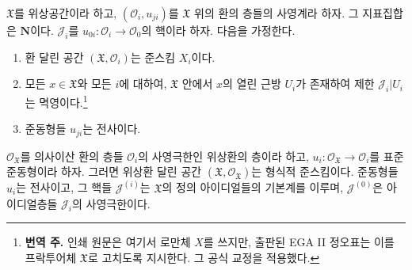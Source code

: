 \begin{proposition}[10.6.3]
\label{I.10.6.3-ko}
$\mathfrak{X}$를 위상공간이라 하고,
$(\mathscr{O}_i,u_{ji})$를 $\mathfrak{X}$ 위의 환의 층들의 사영계라
하자. 그 지표집합은 $\mathbf{N}$이다. $\mathscr{J}_i$를
$u_{0i}:\mathscr{O}_i\to\mathscr{O}_0$의 핵이라 하자. 다음을 가정한다.
\begin{enumerate}
  \item[a)] 환 달린 공간 $(\mathfrak{X},\mathscr{O}_i)$는 준스킴
    $X_i$이다.
  \item[b)] 모든 $x\in\mathfrak{X}$와 모든 $i$에 대하여,
    $\mathfrak{X}$ 안에서 $x$의 열린 근방 $U_i$가 존재하여 제한
    $\mathscr{J}_i|U_i$는 멱영이다.\footnote{\textbf{번역 주.} 인쇄
    원문은 여기서 로만체 $X$를 쓰지만, 출판된 EGA II 정오표는 이를
    프락투어체 $\mathfrak{X}$로 고치도록 지시한다. 그 공식 교정을
    적용했다.}
  \item[c)] 준동형들 $u_{ji}$는 전사이다.
\end{enumerate}


$\mathscr{O}_{\mathfrak{X}}$를 의사이산 환의 층들 $\mathscr{O}_i$의
사영극한인 위상환의 층이라 하고,
$u_i:\mathscr{O}_{\mathfrak{X}}\to\mathscr{O}_i$를 표준 준동형이라
하자. 그러면 위상환 달린 공간
$(\mathfrak{X},\mathscr{O}_{\mathfrak{X}})$는 형식적 준스킴이다.
준동형들 $u_i$는 전사이고, 그 핵들 $\mathscr{J}^{(i)}$는
$\mathfrak{X}$의 정의 아이디얼들의 기본계를 이루며,
$\mathscr{J}^{(0)}$은 아이디얼층들 $\mathscr{J}_i$의 사영극한이다.
\end{proposition}

